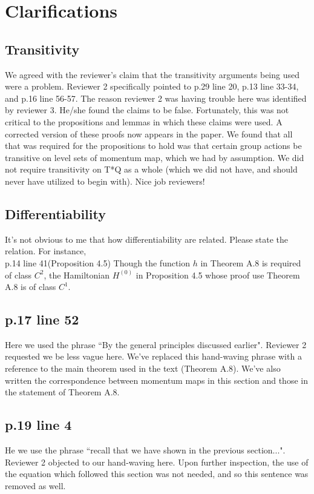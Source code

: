 \documentclass{article}
\begin{document}
\section{Clarifications}

\subsection{Transitivity}
We agreed with the reviewer's claim that the transitivity arguments being used were a problem.  Reviewer 2 specifically pointed to p.29 line 20, p.13 line 33-34, and
p.16 line 56-57.
The reason reviewer 2 was having trouble here was identified by reviewer 3.  He/she found the claims to be false.  Fortunately, this was not critical to the propositions and lemmas in which these claims were used.  A corrected version of these proofs now appears in the paper.  We found that all that was required for the propositions to hold was that certain group actions be transitive on level sets of momentum map, which we had by assumption. We did not require transitivity on T*Q as a whole (which we did not have, and should never have utilized to begin with).  Nice job reviewers!

\subsection{Differentiability}
It's not obvious to me that how differentiability are related. Please state the relation. 
For instance, 
\\
p.14 line 41(Proposition 4.5) Though the function $h$ in Theorem A.8 is required of class $C^2$, 
the Hamiltonian $H^{(0)}$ in Proposition 4.5 whose proof use Theorem A.8 is of class $C^1$.  



\subsection{p.17 line 52}
 Here we used the phrase ``By the general principles discussed earlier".
 Reviewer 2 requested we be less vague here.  We've replaced this hand-waving phrase with a reference to the main theorem used in the text (Theorem A.8).  We've also written the correspondence between momentum maps in this section and those in the statement of Theorem A.8.

\subsection{p.19 line 4}
He we use the phrase ``recall that we have shown in the previous section...". 
Reviewer 2 objected to our hand-waving here.
Upon further inspection, the use of the equation which followed this section was not needed, and so this sentence was removed as well.
\end{document}
